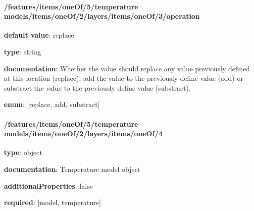 \begin{itemized}
\end{itemized}\paragraph{/features/items/oneOf/5/temperature models/items/oneOf/2/layers/items/oneOf/3/operation} \begin{itemized}
\item {\bf default value}: replace
\item {\bf type}: string
\item {\bf documentation}: Whether the value should replace any value previously defined at this location (replace), add the value to the previously define value (add) or substract the value to the previously define value (substract).
\item {\bf enum}: [replace, add, substract]\end{itemized}\paragraph{/features/items/oneOf/5/temperature models/items/oneOf/2/layers/items/oneOf/4} \begin{itemized}
\item {\bf type}: object
\item {\bf documentation}: Temperature model object
\item {\bf additionalProperties}: false
\item {\bf required}: [model, temperature]\end{itemized}
